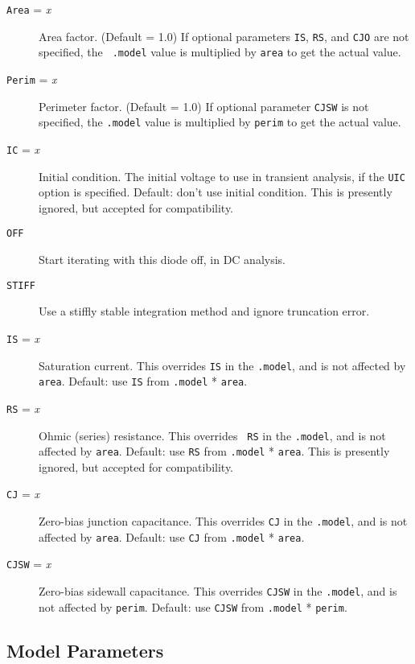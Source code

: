 \begin{description}

\item[{\tt Area} = {\it x}] Area factor.  (Default = 1.0) If optional
parameters {\tt IS}, {\tt RS}, and {\tt CJO} are not specified, the {\tt
.model} value is multiplied by {\tt area} to get the actual value.

\item[{\tt Perim} = {\it x}] Perimeter factor.  (Default = 1.0) If optional
parameter {\tt CJSW} is not specified, the {\tt .model} value is multiplied
by {\tt perim} to get the actual value.

\item[{\tt IC} = {\it x}] Initial condition.  The initial voltage to use in
transient analysis, if the {\tt UIC} option is specified.  Default: don't
use initial condition.  This is presently ignored, but accepted for
compatibility.

\item[{\tt OFF}] Start iterating with this diode off, in DC analysis.

\item[{\tt STIFF}] Use a stiffly stable integration method and
ignore truncation error.

\item[{\tt IS} = {\it x}] Saturation current.  This overrides {\tt IS} in
the {\tt .model}, and is not affected by {\tt area}.  Default: use {\tt IS}
from {\tt .model} * {\tt area}.

\item[{\tt RS} = {\it x}] Ohmic (series) resistance.  This overrides {\tt
RS} in the {\tt .model}, and is not affected by {\tt area}.  Default: use
{\tt RS} from {\tt .model} * {\tt area}.  This is presently ignored, but
accepted for compatibility.

\item[{\tt CJ} = {\it x}] Zero-bias junction capacitance.  This overrides
{\tt CJ} in the {\tt .model}, and is not affected by {\tt area}.  Default:
use {\tt CJ} from {\tt .model} * {\tt area}.

\item[{\tt CJSW} = {\it x}] Zero-bias sidewall capacitance.  This overrides
{\tt CJSW} in the {\tt .model}, and is not affected by {\tt perim}.  Default:
use {\tt CJSW} from {\tt .model} * {\tt perim}.

\end{description}
\subsection{Model Parameters}

